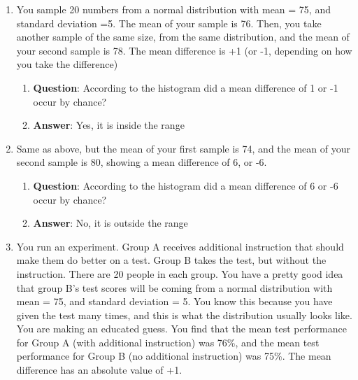 \documentclass[]{book}
\providecommand{\tightlist}{%
  \setlength{\itemsep}{0pt}\setlength{\parskip}{0pt}}
\begin{document}
\begin{enumerate}
\def\labelenumi{\arabic{enumi}.}
\item
  You sample 20 numbers from a normal distribution with mean = 75, and
  standard deviation =5. The mean of your sample is 76. Then, you take
  another sample of the same size, from the same distribution, and the
  mean of your second sample is 78. The mean difference is +1 (or -1,
  depending on how you take the difference)

  \begin{enumerate}
  \def\labelenumii{\alph{enumii}.}
  \tightlist
  \item
    \textbf{Question}: According to the histogram did a mean difference
    of 1 or -1 occur by chance?
  \item
    \textbf{Answer}: Yes, it is inside the range
  \end{enumerate}
\item
  Same as above, but the mean of your first sample is 74, and the mean
  of your second sample is 80, showing a mean difference of 6, or -6.

  \begin{enumerate}
  \def\labelenumii{\alph{enumii}.}
  \tightlist
  \item
    \textbf{Question}: According to the histogram did a mean difference
    of 6 or -6 occur by chance?
  \item
    \textbf{Answer}: No, it is outside the range
  \end{enumerate}
\item
  You run an experiment. Group A receives additional instruction that
  should make them do better on a test. Group B takes the test, but
  without the instruction. There are 20 people in each group. You have a
  pretty good idea that group B's test scores will be coming from a
  normal distribution with mean = 75, and standard deviation = 5. You
  know this because you have given the test many times, and this is what
  the distribution usually looks like. You are making an educated guess.
  You find that the mean test performance for Group A (with additional
  instruction) was 76\%, and the mean test performance for Group B (no
  additional instruction) was 75\%. The mean difference has an absolute
  value of +1.


\end{enumerate}
\end{document}
